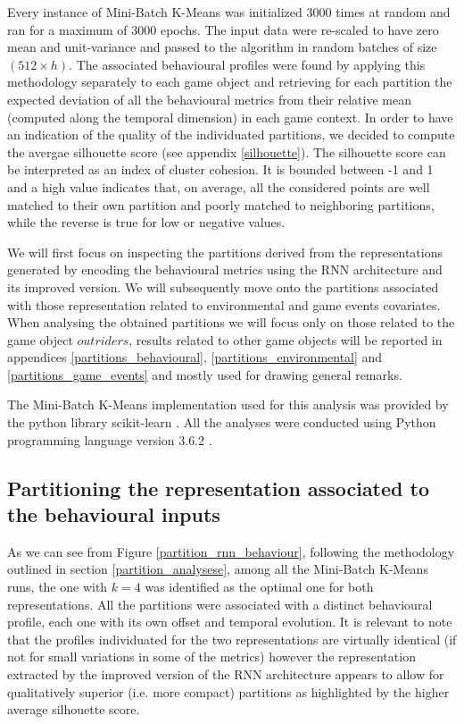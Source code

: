 Every instance of Mini-Batch K-Means was initialized 3000 times at random and ran for a maximum of 3000 epochs. The input data were re-scaled to have zero mean and unit-variance and passed to the algorithm in random batches of size $(512 \times h)$. The associated behavioural profiles were found by applying this methodology separately to each game object and retrieving for each partition the expected deviation of all the behavioural metrics from their relative mean (computed along the temporal dimension) in each game context. In order to have an indication of the quality of the individuated partitions, we decided to compute the avergae silhouette score (see appendix \ref{silhouette}). The silhouette score can be interpreted as an index of cluster cohesion. It is bounded between -1 and 1 and a high value indicates that, on average, all the considered points are well matched to their own partition and poorly matched to neighboring partitions, while the reverse is true for low or negative values. 

We will first focus on inspecting the partitions derived from the representations generated by encoding the behavioural metrics using the RNN architecture and its improved version. We will subsequently move onto the partitions associated with those representation related to environmental and game events covariates. When analysing the obtained partitions we will focus only on those related to the game object $outriders$, results related to other game objects will be reported in appendices \ref{partitions_behavioural}, \ref{partitions_environmental} and \ref{partitions_game_events} and mostly used for drawing general remarks. 

The Mini-Batch K-Means implementation used for this analysis was provided by the python library scikit-learn \cite{scikit-learn}. All the analyses were conducted using Python programming language version 3.6.2 \cite{10.5555/1593511}.

\subsection{Partitioning the representation associated to the behavioural inputs}
\label{partition_behaviour}
As we can see from Figure \ref{partition_rnn_behaviour}, following the methodology outlined in section \ref{partition_analysese}, among all the Mini-Batch K-Means runs, the one with $k=4$ was identified as the optimal one for both representations. All the partitions were associated with a distinct behavioural profile, each one with its own offset and temporal evolution. It is relevant to note that the profiles individuated for the two representations are virtually identical (if not for small variations in some of the metrics) however the representation extracted by the improved version of the RNN architecture appears to allow for qualitatively superior (i.e. more compact) partitions as highlighted by the higher average silhouette score.

